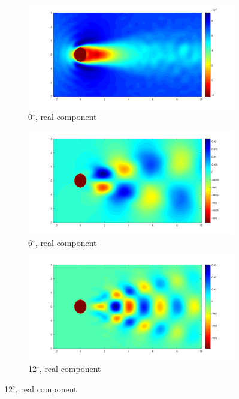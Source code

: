 \documentclass[letterpaper,12pt,peerreviewca,draftcls]{IEEEtran}
\begin{document}
\begin{figure}[h]
	\centering
	\begin{subfigure}[t]{0.30\textwidth}
		\includegraphics[width=\linewidth]{"Figure 16a"}
		\caption{0$^\circ$, real component}
	\end{subfigure}		
	\begin{subfigure}[t]{0.30\textwidth}
		\includegraphics[width=\linewidth]{"Figure 16b"}
		\caption{6$^\circ$, real component}
	\end{subfigure}	
	\begin{subfigure}[t]{0.30\textwidth}
		\includegraphics[width=\linewidth]{"Figure 16c"}
		\caption{12$^\circ$, real component}

\end{subfigure}
\end{figure}
\end{document}
